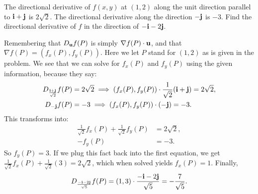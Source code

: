 \begin{problem}
  The directional derivative of $f(x,y)$ at $(1,2)$ along the unit direction parallel to $\mathbf i+\mathbf j$ is $2\sqrt2$. The directional derivative along the direction $-\mathbf j$ is $-3$. Find the directional derivative of $f$ in the direction of $-\mathbf i-2\mathbf j$.
\end{problem}
\begin{solution}
  Remembering that $D_\mathbf u f(P)$ is simply $\nabla f(P)\cdot \mathbf u$, and that $\nabla f(P)=(f_x(P),f_y(P))$. Here we let $P$ stand for $(1,2)$ as is given in the problem. We see that we can solve for $f_x(P)$ and $f_y(P)$ using the given information, because they say:
  \begin{align*}
    D_\frac{\mathbf i+\mathbf j}{\sqrt2}f (P) &= 2\sqrt2\implies (f_x(P),f_y(P))\cdot \frac 1{\sqrt2}(\mathbf i+\mathbf j)=2\sqrt2,\\
    D_{-\mathbf j}f(P) &= -3\implies (f_x(P),f_y(P))\cdot(-\mathbf j)=-3.
  \end{align*}
  This transforms into:
  \begin{align*}
    \frac1{\sqrt2}f_x(P)+\frac1{\sqrt2}f_y(P) &= 2\sqrt2,\\
    -f_y(P) &= -3.
  \end{align*}
  So $f_y(P)=3$. If we plug this fact back into the first equation, we get $\frac 1{\sqrt2}f_x(P)+\frac1{\sqrt2}(3)=2\sqrt2$, which when solved yields $f_x(P)=1$. Finally,
  \[D_{\frac{-\mathbf i-2\mathbf j}{\sqrt5}}f(P)=(1,3)\cdot\frac{-\mathbf i-2\mathbf j}{\sqrt5}=-\frac7{\sqrt5}.\]
\end{solution}

